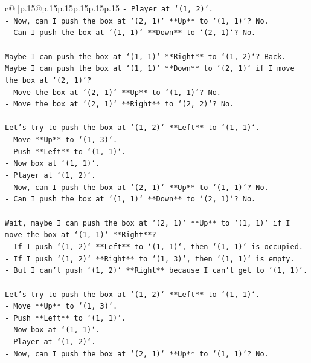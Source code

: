 \documentclass{article}
\begin{document}
{\begin{supertabular}{c@{$\;$}|p{.15\linewidth}@{}p{.15\linewidth}p{.15\linewidth}p{.15\linewidth}p{.15\linewidth}p{.15\linewidth}}
{{{\texttt{{-} Player at `(1, 2)`.} \\
\texttt{{-} Now, can I push the box at `(2, 1)` **Up** to `(1, 1)`? No.} \\
\texttt{{-} Can I push the box at `(1, 1)` **Down** to `(2, 1)`? No.} \\
\\ 
\texttt{Maybe I can push the box at `(1, 1)` **Right** to `(1, 2)`? Back.} \\
\texttt{Maybe I can push the box at `(1, 1)` **Down** to `(2, 1)` if I move the box at `(2, 1)`?} \\
\texttt{{-} Move the box at `(2, 1)` **Up** to `(1, 1)`? No.} \\
\texttt{{-} Move the box at `(2, 1)` **Right** to `(2, 2)`? No.} \\
\\ 
\texttt{Let's try to push the box at `(1, 2)` **Left** to `(1, 1)`.} \\
\texttt{{-} Move **Up** to `(1, 3)`.} \\
\texttt{{-} Push **Left** to `(1, 1)`.} \\
\texttt{{-} Now box at `(1, 1)`.} \\
\texttt{{-} Player at `(1, 2)`.} \\
\texttt{{-} Now, can I push the box at `(2, 1)` **Up** to `(1, 1)`? No.} \\
\texttt{{-} Can I push the box at `(1, 1)` **Down** to `(2, 1)`? No.} \\
\\ 
\texttt{Wait, maybe I can push the box at `(2, 1)` **Up** to `(1, 1)` if I move the box at `(1, 1)` **Right**?} \\
\texttt{{-} If I push `(1, 2)` **Left** to `(1, 1)`, then `(1, 1)` is occupied.} \\
\texttt{{-} If I push `(1, 2)` **Right** to `(1, 3)`, then `(1, 1)` is empty.} \\
\texttt{{-} But I can't push `(1, 2)` **Right** because I can't get to `(1, 1)`.} \\
\\ 
\texttt{Let's try to push the box at `(1, 2)` **Left** to `(1, 1)`.} \\
\texttt{{-} Move **Up** to `(1, 3)`.} \\
\texttt{{-} Push **Left** to `(1, 1)`.} \\
\texttt{{-} Now box at `(1, 1)`.} \\
\texttt{{-} Player at `(1, 2)`.} \\
\texttt{{-} Now, can I push the box at `(2, 1)` **Up** to `(1, 1)`? No.} \\
}}}
\end{supertabular}}
\end{document}
